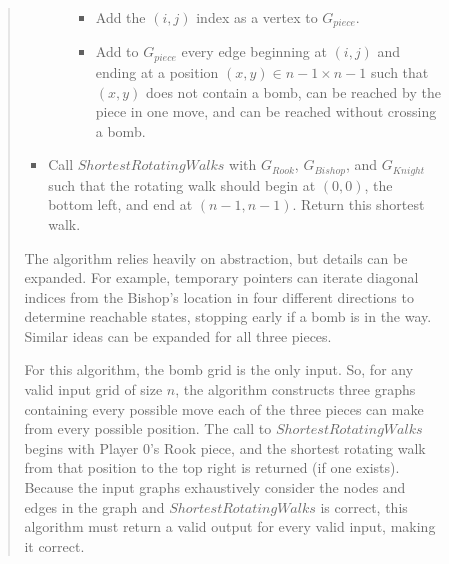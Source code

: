 \documentclass[11pt]{article}
\begin{document}
\begin{enumerate}
\begin{enumerate}
\begin{quote}
\begin{itemize}
\begin{itemize}
                    \begin{itemize}
                        \item Add the $(i, j)$ index as a vertex to $G_{piece}$.
                        \item Add to $G_{piece}$ every edge beginning at $(i, j)$ and ending at a position $(x, y) \in n - 1 \times n - 1$ such that $(x, y)$ does not contain a bomb, can be reached by the piece in one move, and can be reached without crossing a bomb.
                    \end{itemize}
                \end{itemize}
                \item Call $ShortestRotatingWalks$ with $G_{Rook}$, $G_{Bishop}$, and $G_{Knight}$ such that the rotating walk should begin at $(0, 0)$, the bottom left, and end at $(n - 1, n - 1)$. Return this shortest walk. 
            \end{itemize}
            \vspace{1em}
            The algorithm relies heavily on abstraction, but details can be expanded. For example, temporary pointers can iterate diagonal indices from the Bishop's location in four different directions to determine reachable states, stopping early if a bomb is in the way. Similar ideas can be expanded for all three pieces. \newline 
            
            For this algorithm, the bomb grid is the only input. So, for any valid input grid of size $n$, the algorithm constructs three graphs containing every possible move each of the three pieces can make from every possible position. The call to $ShortestRotatingWalks$ begins with Player 0's Rook piece, and the shortest rotating walk from that position to the top right is returned (if one exists). Because the input graphs exhaustively consider the nodes and edges in the graph and $ShortestRotatingWalks$ is correct, this algorithm must return a valid output for every valid input, making it correct. \newline 


\end{quote}
\end{enumerate}
\end{enumerate}
\end{document}
